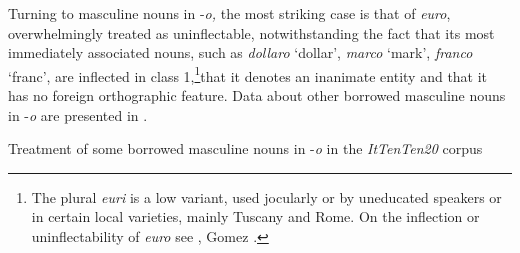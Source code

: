 \documentclass[output=paper]{langscibook}
\begin{document}
Turning to masculine nouns in \nobreakdash-\textit{o,} the most striking case is that of \textit{euro}, overwhelmingly treated as uninflectable, notwithstanding the fact that its most immediately associated nouns, such as \textit{dollaro} ‘dollar’, \textit{marco} ‘mark’, \textit{franco} ‘franc’, are inflected in class 1,\footnote{The plural \textit{euri} is a low variant, used jocularly or by uneducated speakers or in certain local varieties, mainly Tuscany and Rome. On the inflection or uninflectability of \textit{euro} see \citet{Fanfani2001}, Gomez \citet{Gane2003}.}that it denotes an inanimate entity and that it has no foreign orthographic feature. Data about other borrowed masculine nouns in \nobreakdash-\textit{o} are presented in .

\begin{stylelsTable}
 Treatment of some borrowed masculine nouns in \nobreakdash-\textit{o} in the \textit{ItTenTen20} corpus
\end{stylelsTable}
\end{document}
